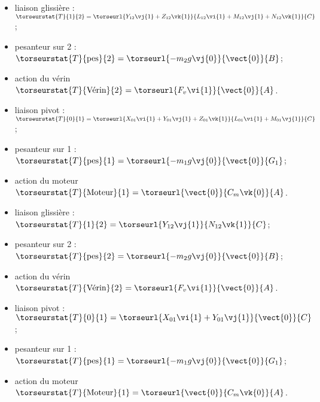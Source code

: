 \ifprof
\begin{itemize}
\item liaison glissière : $\torseurstat{T}{1}{2} = \torseurl{Y_{12}\vj{1}+Z_{12}\vk{1}}{L_{12}\vi{1}+M_{12}\vj{1}+N_{12}\vk{1}}{C}$;
\item pesanteur sur 2 : $\torseurstat{T}{\text{pes}}{2} = \torseurl{-m_2 g \vj{0}}{\vect{0}}{B}$;
\item action du vérin $\torseurstat{T}{\text{Vérin}}{2} =  \torseurl{F_v \vi{1}}{\vect{0}}{A}$.
\item liaison pivot : $\torseurstat{T}{0}{1}= \torseurl{X_{01}\vi{1}+Y_{01}\vj{1}+Z_{01}\vk{1}}{L_{01}\vi{1}+M_{01}\vj{1}}{C}$;
\item pesanteur sur 1 : $\torseurstat{T}{\text{pes}}{1} = \torseurl{-m_1 g \vj{0}}{\vect{0}}{G_1}$;
\item action du moteur $\torseurstat{T}{\text{Moteur}}{1} =  \torseurl{\vect{0}}{C_m \vk{0}}{A}$.
\end{itemize}

\else
\fi

\ifprof
\begin{itemize}
\item liaison glissière : $\torseurstat{T}{1}{2} = \torseurl{Y_{12}\vj{1}}{N_{12}\vk{1}}{C}$;
\item pesanteur sur 2 : $\torseurstat{T}{\text{pes}}{2} = \torseurl{-m_2 g \vj{0}}{\vect{0}}{B}$;
\item action du vérin $\torseurstat{T}{\text{Vérin}}{2} =  \torseurl{F_v \vi{1}}{\vect{0}}{A}$.
\item liaison pivot : $\torseurstat{T}{0}{1}= \torseurl{X_{01}\vi{1}+Y_{01}\vj{1}}{\vect{0}}{C}$;
\item pesanteur sur 1 : $\torseurstat{T}{\text{pes}}{1} = \torseurl{-m_1 g \vj{0}}{\vect{0}}{G_1}$;
\item action du moteur $\torseurstat{T}{\text{Moteur}}{1} =  \torseurl{\vect{0}}{C_m \vk{0}}{A}$.
\end{itemize}

